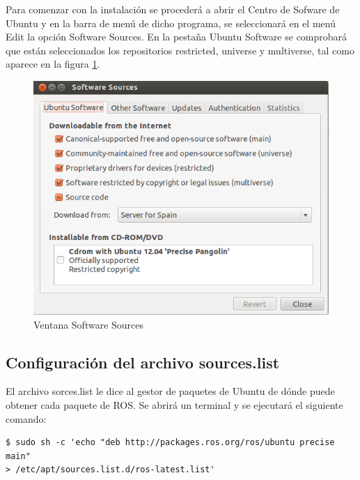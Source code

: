 \documentclass[12pt, a4paper]{report}
\begin{document}
Para comenzar con la instalación se procederá a abrir el Centro de Sofware de Ubuntu y en la barra de menú de dicho programa, se seleccionará en el menú Edit la opción Software Sources. En la pestaña Ubuntu Software se comprobará que están seleccionados los repositorios restricted, universe y multiverse, tal como aparece en la figura \ref{fig: software_sources}.\\

\begin{figure}[h]
	\centering
		\includegraphics[scale=0.4]{../img/software_sources.png} 
	\caption[Ventana Software Sources]{Ventana Software Sources} 
	\label{fig: software_sources}
\end{figure}


\subsection{Configuración del archivo sources.list}

El archivo sorces.list le dice al gestor de paquetes de Ubuntu de dónde puede obtener cada paquete de ROS. Se abrirá un terminal y se ejecutará el siguiente comando:\\

\begin{verbatim}
$ sudo sh -c 'echo "deb http://packages.ros.org/ros/ubuntu precise main" 
> /etc/apt/sources.list.d/ros-latest.list'
\end{verbatim}
\end{document}
